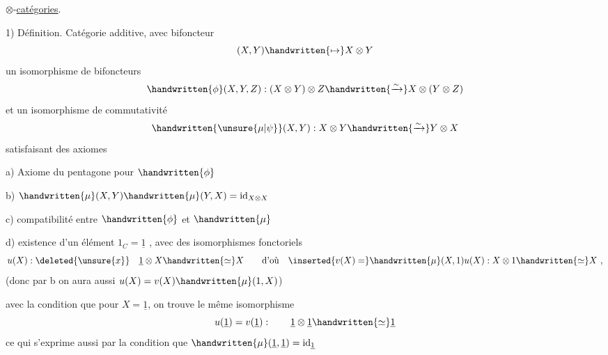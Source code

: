 
$\otimes$-\uline{catégories}.

1) Définition. Catégorie  additive, avec bifoncteur
\[
(X,Y)\handwritten{\mapsto}X\otimes Y
\]
 un  isomorphisme de bifoncteurs
\[
\handwritten{\phi}(X,Y,Z): (X\otimes Y)\otimes Z\handwritten{\xrightarrow{\sim}}X\otimes(Y\otimes Z)
\]
et un isomorphisme de commutativité
\[
\handwritten{\unsure{\mu|\psi}}(X,Y): X\otimes Y\handwritten{\xrightarrow{\sim}}Y\otimes X
\]
satisfaisant des axiomes

a) Axiome du pentagone pour $\handwritten{\phi}$ 

b) $\handwritten{\mu}(X,Y)\handwritten{\mu}(Y,X)=\mathrm{id}_{X\otimes X}$ \handwritten{;}

c) compatibilité entre $\handwritten{\phi}$ et $\handwritten{\mu}$ 

d) existence d'un élément $1_C=\underline{1}$ , avec des isomorphismes fonctoriels
\[
u(X):\deleted{\unsure{x}}\quad\underline{1}\otimes X\handwritten{\simeq}X
\qquad\text{d'où}\quad
\inserted{v(X)=}\handwritten{\mu}(X,1)u(X): X\otimes1\handwritten{\simeq}X\ ,
\]
(donc par b on aura aussi $u(X)=v(X)\handwritten{\mu}(1,X)$)

avec la condition que pour $X=\underline{1}$, on trouve le même isomorphisme
\[
u(\underline{1})=v(\underline{1}) :\qquad \underline{1}\otimes\underline{1}\handwritten{\simeq}\underline{1}
\]
ce qui s'exprime aussi par la condition que $\handwritten{\mu}(\underline{1},\underline{1})=\mathrm{id}_{\underline{1}}$ \handwritten{;}


